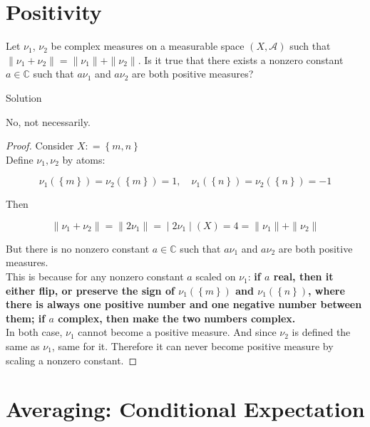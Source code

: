 \section{Positivity}\label{positivity}

Let \(\nu_{1}\), \(\nu_{2}\) be complex measures on a measurable space \((X,\mathcal{A})\) such that \(\parallel \nu_{1} + \nu_{2} \parallel = \parallel \nu_{1} \parallel + \parallel \nu_{2} \parallel\). Is it true that there exists a nonzero constant \(a \in \mathbb{C}\) such that \(a\nu_{1}\) and \(a\nu_{2}\) are both positive measures?

\begin{qlsolution}{Solution}

No, not necessarily.

\end{qlsolution}

\begin{proof}

Consider \(X: = \left\{ {m,n} \right\}\)\\
Define \(\nu_{1},\nu_{2}\) by atoms:

\[\nu_{1}(\left\{ m \right\}) = \nu_{2}(\left\{ m \right\}) = 1,\quad\nu_{1}(\left\{ n \right\}) = \nu_{2}(\left\{ n \right\}) = - 1\]

Then

\[\left. \parallel \nu_{1} + \nu_{2} \parallel = \parallel 2\nu_{1} \parallel = \middle| 2\nu_{1} \middle| (X) = 4 = \parallel \nu_{1} \parallel + \parallel \nu_{2} \parallel \right.\]

But there is no nonzero constant \(a \in \mathbb{C}\) such that \(a\nu_{1}\) and \(a\nu_{2}\) are both positive measures.\\
This is because for any nonzero constant \(a\) scaled on \(\nu_{1}\): \textbf{if \(a\) real, then it either flip, or preserve the sign of \(\nu_{1}(\left\{ m \right\})\) and \(\nu_{1}(\left\{ n \right\})\), where there is always one positive number and one negative number between them; if \(a\) complex, then make the two numbers complex.}\\
In both case, \(\nu_{1}\) cannot become a positive measure. And since \(\nu_{2}\) is defined the same as \(\nu_{1}\), same for it. Therefore it can never become positive measure by scaling a nonzero constant.

\end{proof}

\section{Averaging: Conditional Expectation}\label{averaging-conditional-expectation}

